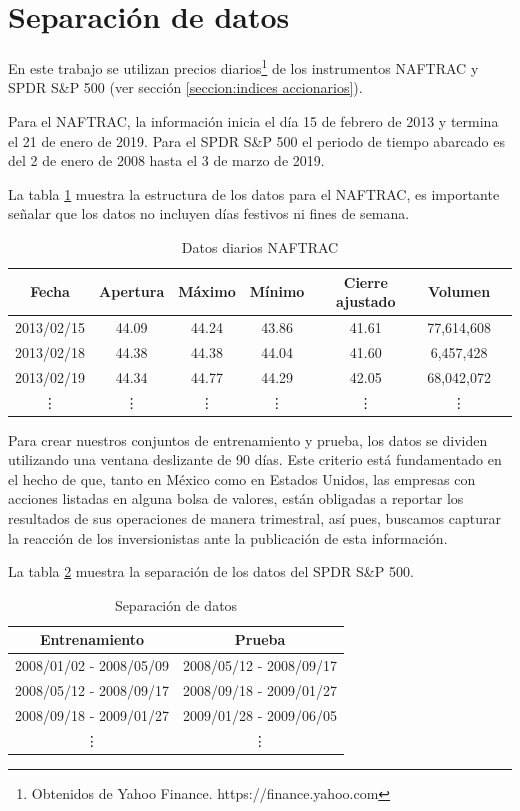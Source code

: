 \documentclass[12pt]{report}
\theoremstyle{break}
\theoremstyle{break}
\begin{document}
\section{Separación de datos}
\label{seccion:separacion de datos}
En este trabajo se utilizan precios diarios\footnote{Obtenidos de Yahoo Finance. https://finance.yahoo.com} de los instrumentos NAFTRAC y SPDR S\&P 500 (ver sección \ref{seccion:indices accionarios}).

Para el NAFTRAC, la información inicia el día 15 de febrero de 2013 y termina el 21 de enero de 2019. Para el SPDR S\&P 500 el periodo de tiempo abarcado es del 2 de enero de 2008 hasta  el 3 de marzo de 2019.

La tabla \ref{tabla:Ejemplo datos diarios NAFTRAC} muestra la estructura de los datos para el NAFTRAC, es importante señalar que los datos no incluyen días festivos ni fines de semana.

\begin{table}[h]
\centering
\begin{tabular}{ccccccc}
\hline
\textbf{Fecha} & \textbf{Apertura} & \textbf{Máximo} & \textbf{Mínimo} & \textbf{Cierre  ajustado} &  \textbf{Volumen} \\
\hline
2013/02/15 & 44.09 & 44.24 & 43.86  & 41.61 & 77,614,608\\
2013/02/18 & 44.38 & 44.38 & 44.04  & 41.60 & 6,457,428\\
2013/02/19 & 44.34 & 44.77 & 44.29  & 42.05 & 68,042,072\\
\vdots & \vdots & \vdots & \vdots  & \vdots & \vdots \\
\hline
\end{tabular}
\caption{\label{tabla:Ejemplo datos diarios NAFTRAC} Datos diarios NAFTRAC}
\end{table}

Para crear nuestros conjuntos de entrenamiento y prueba, los datos se dividen utilizando una ventana deslizante de 90 días. Este criterio está fundamentado en el hecho de que, tanto en México como en Estados Unidos, las empresas con acciones listadas en alguna bolsa de valores, están obligadas a reportar los resultados de sus operaciones de manera trimestral, así pues, buscamos capturar la reacción de los inversionistas ante la publicación de esta información.

La tabla \ref{tabla:data split SP500} muestra la separación de los datos del SPDR S\&P 500.
\begin{table}[h]
\centering
\begin{tabular}{cc}
\hline
\textbf{Entrenamiento} & \textbf{Prueba} \\
\hline
2008/01/02 - 2008/05/09 & 2008/05/12 - 2008/09/17 \\
2008/05/12 - 2008/09/17 & 2008/09/18 - 2009/01/27 \\
2008/09/18 - 2009/01/27 & 2009/01/28 - 2009/06/05 \\
\vdots & \vdots \\
\hline
\end{tabular}
\caption{\label{tabla:data split SP500} Separación de datos}
\end{table}
\end{document}
